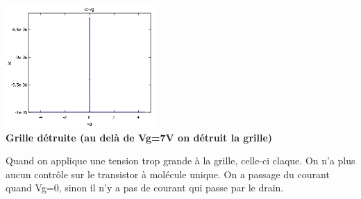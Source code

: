 \begin{center}
    \includegraphics[width=220px]{Images/4_Grille_Detruite.png}\\
    \textbf{Grille détruite (au delà de Vg=7V on détruit la grille)}
\end{center}
Quand on applique une tension trop grande à la grille, celle-ci claque. On n'a plus aucun contrôle sur le transistor à molécule unique. On a passage du courant quand Vg=0, sinon il n'y a pas de courant qui passe par le drain.
